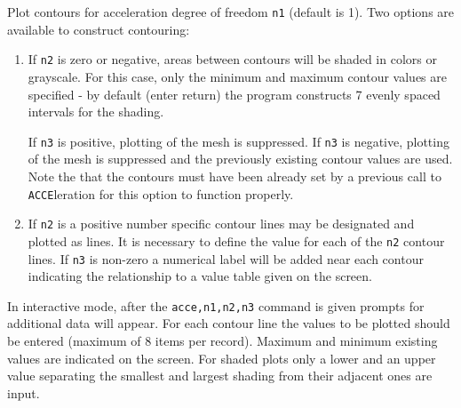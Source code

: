 \headb

Plot contours for acceleration degree of freedom {\tt n1} (default is 1).
Two options are available to construct contouring:
\begin{enumerate}
\item{
If {\tt n2} is zero or negative, areas between contours
will be shaded in colors or grayscale.  For this case, only
the minimum and maximum contour values are specified - by
default (enter return) the program constructs 7 evenly
spaced intervals for the shading.

If {\tt n3} is positive, plotting of the mesh is suppressed.
If {\tt n3} is negative, plotting
of the mesh is suppressed and the previously existing
contour values are used.  Note the that the contours must
have been already set by a previous call to {\tt ACCE}leration for this
option to function properly.}
\item{
If {\tt n2} is a positive number specific contour lines may be designated
and plotted as lines. It is necessary to define the value for each of the
{\tt n2} contour lines.
If {\tt n3} is non-zero a numerical label will
be added near each contour indicating the relationship to a
value table given on the screen.}
\end{enumerate}

In interactive mode, after the {\tt acce,n1,n2,n3} command
is given prompts for additional data will appear.  For each
contour line the values to be plotted should be entered
(maximum of 8 items per record).  Maximum and minimum existing values
are indicated on the screen.
For shaded plots only a lower and an upper value separating the smallest
and largest shading from their adjacent ones are input.

\vfill
\eject
